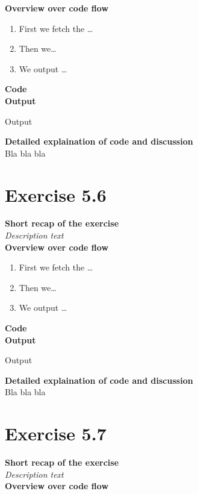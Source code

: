 \documentclass{article}
\newcommand\pythonstyle{\lstset{
language=python,
breaklines=true,
basicstyle=\ttfamily\small,
otherkeywords={1, 2, 3, 4, 5, 6, 7, 8 ,9 , 0, -, =, +, [, ], (, ), \{, \}, :, *, !},             %
keywordstyle=\color{blue},
emph={class, pass, in, for, while, if, is, elif, else, not, and, or, OR
    def, print, exec, break, continue, return},
emphstyle=\color{black}\bfseries,
emph={[2]True, False, None, self},
emphstyle=[2]\color{purple},
emph={[3]from, import, as},
emphstyle=[3]\color{blue},
stringstyle=\color{red},
frame=tb,
showstringspaces=false,
morecomment=[s]{"""}{"""},
commentstyle=\color{gray},
rulesepcolor=\color{blue},
title=\lstname
}}
\newcommand\pythonexternal[2][]{{
\pythonstyle
}}
\begin{document}
\textbf{Overview over code flow}\\

\begin{enumerate}
  \item First we fetch the \ldots
  \item Then we\ldots
  \item We output \ldots\\
\end{enumerate}

\textbf{Code}\\
\textbf{Output}
\begin{pythonOutput}
Output
\end{pythonOutput}
\textbf{Detailed explaination of code and discussion}\\
Bla bla bla
\section{Exercise 5.6}
\textbf{Short recap of the exercise}\\
\textit{Description text}\\

\textbf{Overview over code flow}\\

\begin{enumerate}
  \item First we fetch the \ldots
  \item Then we\ldots
  \item We output \ldots\\
\end{enumerate}

\textbf{Code}\\
\textbf{Output}
\begin{pythonOutput}
Output
\end{pythonOutput}
\textbf{Detailed explaination of code and discussion}\\
Bla bla bla
\section{Exercise 5.7}
\textbf{Short recap of the exercise}\\
\textit{Description text}\\

\textbf{Overview over code flow}\\
\end{document}
